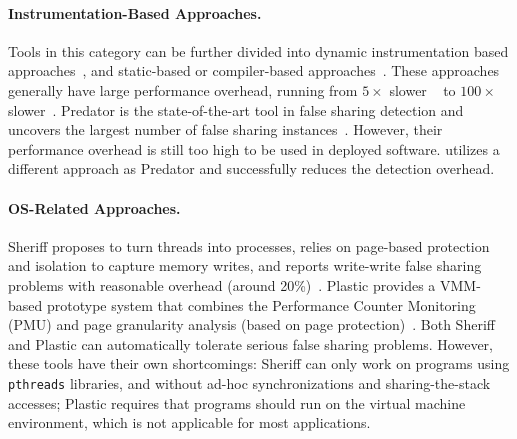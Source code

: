 \paragraph{Instrumentation-Based Approaches.} Tools in this category can be further divided into dynamic instrumentation based approaches~\cite{falseshare:binaryinstrumentation1, falseshare:binaryinstrumentation2, qinzhao}, and static-based or compiler-based approaches~\cite{Predator}.
These approaches generally have large performance overhead, running from $5\times$ slower ~\cite{qinzhao, Predator} to $100\times$ slower~\cite{falseshare:binaryinstrumentation1, falseshare:binaryinstrumentation2}. Predator is the state-of-the-art tool in false sharing detection and uncovers the largest number of false sharing instances~\cite{Predator}. However, their performance overhead is still too high to be used in deployed software. \cheetah{} utilizes a different approach as Predator and successfully reduces the detection overhead. 


\paragraph{OS-Related Approaches.} Sheriff proposes to turn threads into processes, relies on page-based protection and isolation to capture memory writes, and reports write-write false sharing problems with reasonable overhead (around 20\%)~\cite{Sheriff}. Plastic provides a VMM-based prototype system that combines the Performance Counter Monitoring (PMU) and page granularity analysis (based on page protection)~\cite{OSdetection}. Both Sheriff and Plastic can automatically tolerate serious false sharing problems. However, these tools have their own shortcomings: Sheriff can only work on programs using \texttt{pthreads} libraries, and without ad-hoc synchronizations and sharing-the-stack accesses; Plastic requires that programs should run on the virtual machine environment, which is not applicable for most applications.   

